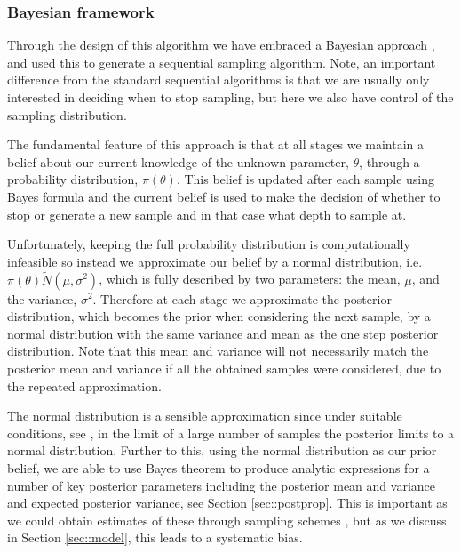 \subsubsection{Bayesian framework}\label{sec::bayes}
Through the design of this algorithm we have embraced a Bayesian approach \cite{}, and used this to generate a sequential sampling algorithm. Note, an important difference from the standard sequential algorithms is that we are usually only interested in deciding when to stop sampling, but here we also have control of the sampling distribution.

The fundamental feature of this approach is that at all stages we maintain a belief about our current knowledge of the unknown parameter, $\theta$, through a probability distribution, $\pi(\theta)$. This belief is updated after each sample using Bayes formula \cite{} and the current belief is used to make the decision of whether to
stop or generate a new sample and in that case what depth to sample at.

Unfortunately, keeping the full probability distribution is computationally infeasible so instead we approximate our belief by a normal distribution, i.e. $\pi(\theta) \tilde N(\mu,\sigma^2)$, which is fully described by two parameters: the mean, $\mu$, and the variance, $\sigma^2$. Therefore at each stage we approximate the posterior distribution, which becomes the prior when considering the next sample, by a normal distribution with the same variance and mean as the one step posterior distribution. Note that this mean and variance will not necessarily match the posterior mean and variance if all the obtained samples were considered, due to the repeated approximation.

The normal distribution is a sensible approximation since under suitable conditions, see \cite{}, in the limit of a large number of samples the posterior limits to a normal distribution. Further to this, using the normal distribution as our prior belief, we are able to use Bayes theorem to produce analytic expressions for a number of key posterior parameters including the posterior mean and variance and expected posterior variance, see Section \ref{sec::postprop}. This is important as we could obtain estimates of these through sampling schemes \cite{}, but as we discuss in Section \ref{sec::model}, this leads to a systematic bias.


